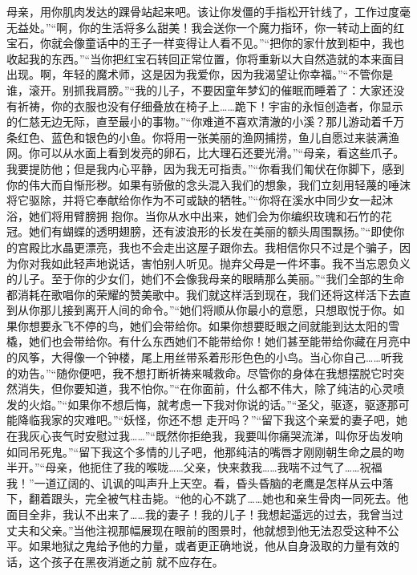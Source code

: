 \documentclass{article}
\begin{document}
\newpage
母亲，用你肌肉发达的踝骨站起来吧。该让你发僵的手指松开针线了，工作过度毫无益处。”“啊，你的生活将多么甜美！我会送你一个魔力指环，你一转动上面的红宝石，你就会像童话中的王子一样变得让人看不见。”“把你的家什放到柜中，我也收起我的东西。”“当你把红宝石转回正常位置，你将重新以大自然造就的本来面目出现。啊，年轻的魔术师，这是因为我爱你，因为我渴望让你幸福。”“不管你是谁，滚开。别抓我肩膀。”“我的儿子，不要因童年梦幻的催眠而睡着了：大家还没有祈祷，你的衣服也没有仔细叠放在椅子上……跪下！宇宙的永恒创造者，你显示的仁慈无边无际，直至最小的事物。”“你难道不喜欢清澈的小溪？那儿游动着千万条红色、蓝色和银色的小鱼。你将用一张美丽的渔网捕捞，鱼儿自愿过来装满渔网。你可以从水面上看到发亮的卵石，比大理石还要光滑。”“母亲，看这些爪子。我要提防他；但是我内心平静，因为我无可指责。”“你看我们匍伏在你脚下，感到你的伟大而自惭形秽。如果有骄傲的念头混入我们的想象，我们立刻用轻蔑的唾沫将它驱除，并将它奉献给你作为不可或缺的牺牲。”“你将在溪水中同少女一起沐浴，她们将用臂膀拥
\newpage
抱你。当你从水中出来，她们会为你编织玫瑰和石竹的花冠。她们有蝴蝶的透明翅膀，还有波浪形的长发在美丽的额头周围飘扬。”“即使你的宫殿比水晶更漂亮，我也不会走出这屋子跟你去。我相信你只不过是个骗子，因为你对我如此轻声地说话，害怕别人听见。抛弃父母是一件坏事。我不当忘恩负义的儿子。至于你的少女们，她们不会像我母亲的眼睛那么美丽。”“我们全部的生命都消耗在歌唱你的荣耀的赞美歌中。我们就这样活到现在，我们还将这样活下去直到从你那儿接到离开人间的命令。”“她们将顺从你最小的意愿，只想取悦于你。如果你想要永飞不停的鸟，她们会带给你。如果你想要眨眼之间就能到达太阳的雪橇，她们也会带给你。有什么东西她们不能带给你！她们甚至能带给你藏在月亮中的风筝，大得像一个钟楼，尾上用丝带系着形形色色的小鸟。当心你自己……听我的劝告。”“随你便吧，我不想打断祈祷来喊救命。尽管你的身体在我想摆脱它时突然消失，但你要知道，我不怕你。”“在你面前，什么都不伟大，除了纯洁的心灵喷发的火焰。”“如果你不想后悔，就考虑一下我对你说的话。”“圣父，驱逐，驱逐那可能降临我家的灾难吧。”“妖怪，你还不想
\newpage
走开吗？”“留下我这个亲爱的妻子吧，她在我灰心丧气时安慰过我……”“既然你拒绝我，我要叫你痛哭流涕，叫你牙齿发响如同吊死鬼。”“留下我这个多情的儿子吧，他那纯洁的嘴唇才刚刚朝生命之晨的吻半开。”“母亲，他扼住了我的喉咙……父亲，快来救我……我喘不过气了……祝福我！”一道辽阔的、讥讽的叫声升上天空。看，昏头昏脑的老鹰是怎样从云中落下，翻着跟头，完全被气柱击毙。“他的心不跳了……她也和亲生骨肉一同死去。他面目全非，我认不出来了……我的妻子！我的儿子！我想起遥远的过去，我曾当过丈夫和父亲。”当他注视那幅展现在眼前的图景时，他就想到他无法忍受这种不公平。如果地狱之鬼给予他的力量，或者更正确地说，他从自身汲取的力量有效的话，这个孩子在黑夜消逝之前
就不应存在。 
\end{document}
